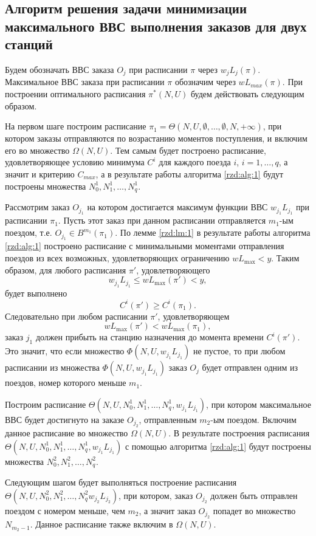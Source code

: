\subsection{Алгоритм решения задачи минимизации максимального ВВС выполнения заказов для двух станций}\label{rzd:sec:main2:7}
Будем обозначать ВВС заказа $O_j$ при расписании $\pi$ через $w_j L_j(\pi)$. Максимальное ВВС заказа при расписании $\pi$ обозначим через $wL_{max}(\pi)$.
При построении оптимального расписания $\pi^{*}(N,U)$ будем действовать следующим образом.

На первом шаге построим расписание $\pi_1 = \Theta(N,U,\emptyset, \dots,\emptyset, N, +\infty)$, при котором заказы отправляются по возрастанию моментов поступления, и включим его во множество $\Omega(N, U)$. Тем самым будет построено расписание, удовлетворяющее условию минимума $C^i$ для каждого поезда $i$, $i=1, \dots, q$, а значит и критерию $C_{max}$, а в результате работы алгоритма \ref{rzd:alg:1} будут построены множества $N_0^1, N_1^1, \dots, N_q^1.$

Рассмотрим заказ $O_{j_1}$ на котором достигается максимум функции ВВС $w_{j_1} L_{j_1}$ при расписании $\pi_1$. Пусть этот заказ при данном расписании отправляется $m_1$-ым поездом, т.е. $O_{j_1} \in B^{m_1} (\pi_1)$. По лемме \ref{rzd:lm:1} в результате работы алгоритма \ref{rzd:alg:1} построено расписание с минимальными моментами отправления поездов из всех возможных, удовлетворяющих ограничению $wL_{\max}<y$. Таким образом, для любого расписания $\pi'$, удовлетворяющего
$$w_{j_1}L_{j_1} \leq wL_{\max}(\pi')<y,$$
будет выполнено
$$C^i(\pi') \geq C^i(\pi_1).$$
Следовательно при любом расписании $\pi'$, удовлетворяющем
$$wL_{\max} (\pi') < wL_{\max} (\pi_1),$$
заказ $j_1$ должен прибыть на станцию назначения до момента времени $C^i(\pi')$.
Это значит, что если множество $\Phi(N,U, w_{j_1} L_{j_1})$ не пустое, то при любом расписании из множества $\Phi(N,U, w_{j_1} L_{j_1})$ заказ $O_j$ будет отправлен одним из поездов, номер которого меньше $m_1$.

Построим расписание $\Theta(N,U,N_0^1, N_1^1, \dots, N_q^1, w_{j_1} L_{j_1})$, при котором максимальное ВВС будет достигнуто на заказе $O_{j_2}$, отправленным $m_2$-ым поездом.  Включим данное расписание во множество $\Omega(N,U)$. В результате построения расписания $\Theta(N,U,N_0^1, N_1^1, \dots, N_q^1, w_{j_1} L_{j_1})$ с помощью алгоритма \ref{rzd:alg:1} будут построены множества $N_0^2, N_1^2, \dots, N_q^2$.

Следующим шагом будет выполняться построение расписания $\Theta(N,U,N_0^2, N_1^2, \dots, N_q^2 w_{j_2} L_{j_2})$, при котором, заказ $O_{j_2}$ должен быть отправлен поездом с номером меньше, чем $m_2$, а значит заказ $O_{j_2}$ попадет во множество $N_{m_2 - 1}$. Данное расписание также включим в $\Omega(N,U)$.

